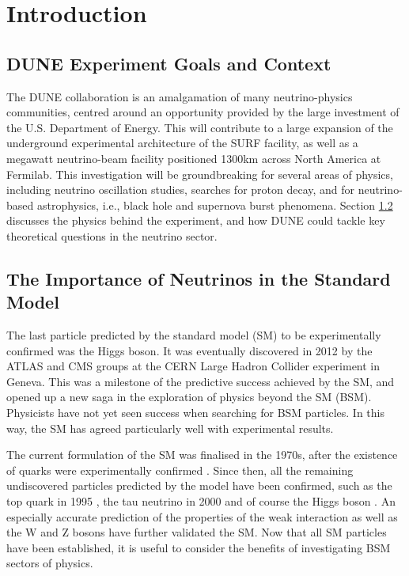 \documentclass[10pt]{article}
\begin{document}
\clearpage
\addtocounter{page}{2}

\newpage
\tableofcontents
\newpage
\listoffigures

\newpage

\section{Introduction}

\subsection{DUNE Experiment Goals and Context}
The DUNE collaboration is an amalgamation of many neutrino-physics communities, centred around an opportunity provided by the large investment of the U.S. Department of Energy. This will contribute to a large expansion of the underground experimental architecture of the SURF facility, as well as a megawatt neutrino-beam facility positioned 1300km across North America at Fermilab. This investigation will be groundbreaking for several areas of physics, including neutrino oscillation studies, searches for proton decay, and for neutrino-based astrophysics, i.e., black hole and supernova burst phenomena. Section \ref{neutrinos} discusses the physics behind the experiment, and how DUNE could tackle key theoretical questions in the neutrino sector.

\subsection{The Importance of Neutrinos in the Standard Model} \label{neutrinos}

The last particle predicted by the standard model (SM) to be experimentally confirmed was the Higgs boson. It was eventually discovered in 2012 by the ATLAS and CMS groups at the CERN Large Hadron Collider experiment in Geneva. This was a milestone of the predictive success achieved by the SM, and opened up a new saga in the exploration of physics beyond the SM (BSM). Physicists have not yet seen success when searching for BSM particles. In this way, the SM has agreed particularly well with experimental results.

The current formulation of the SM was finalised in the 1970s, after the existence of quarks were experimentally confirmed \cite{griffiths1987introduction}. Since then, all the remaining undiscovered particles predicted by the model have been confirmed, such as the top quark in 1995 \cite{Abe_1995}, the tau neutrino in 2000 \cite{Kodama_2001} and of course the Higgs boson \cite{off2012cern}. An especially accurate prediction of the properties of the weak interaction as well as the W and Z bosons have further validated the SM. Now that all SM particles have been established, it is useful to consider the benefits of investigating BSM sectors of physics.
\end{document}
